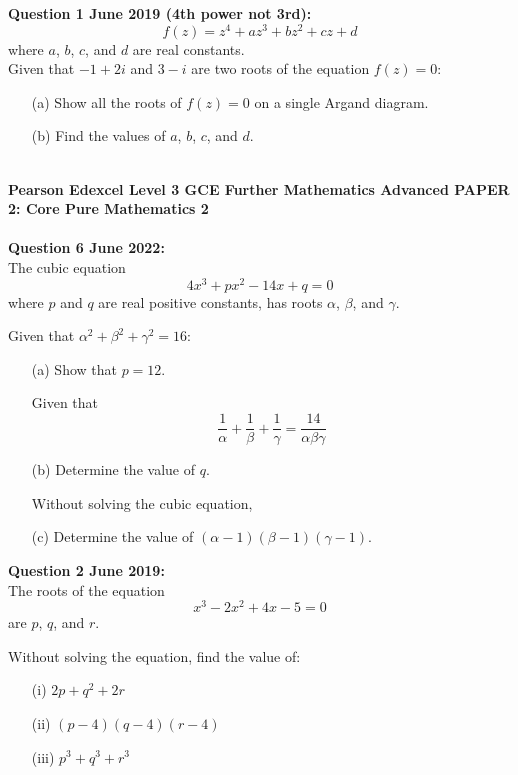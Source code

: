 \documentclass[12pt]{article}
\begin{document}
\textbf{Question 1 June 2019 (4th power not 3rd):}
\[f(z) = z^4 + az^3 + bz^2 + cz + d\] where \( a \), \( b \), \( c \), and \( d \) are real constants.\\
Given that \( -1 + 2i \) and \( 3 - i \) are two roots of the equation \( f(z) = 0 \):

\begin{enumerate}
    \item[(a)] Show all the roots of \( f(z) = 0 \) on a single Argand diagram.
    \item[(b)] Find the values of \( a \), \( b \), \( c \), and \( d \).\\\\
\end{enumerate}

\textbf{Pearson Edexcel Level 3 GCE Further Mathematics
Advanced PAPER 2: Core Pure Mathematics 2}\\\\

\textbf{Question 6 June 2022:}\\
The cubic equation
\[4x^3 + px^2 - 14x + q = 0\]
where \( p \) and \( q \) are real positive constants, has roots \( \alpha \), \( \beta \), and \( \gamma \).

Given that \( \alpha^2 + \beta^2 + \gamma^2 = 16 \):

\begin{enumerate}
    \item[(a)] Show that \( p = 12 \).
    
    Given that 
    \[\frac{1}{\alpha} + \frac{1}{\beta} + \frac{1}{\gamma} = \frac{14}{\alpha \beta \gamma}\]
    \item[(b)] Determine the value of \( q \).
    
    Without solving the cubic equation,
    \item[(c)] Determine the value of \( (\alpha - 1)(\beta - 1)(\gamma - 1) \).
\end{enumerate}

\textbf{Question 2 June 2019:}\\
The roots of the equation 
\[x^3 - 2x^2 + 4x - 5 = 0\]
are \( p \), \( q \), and \( r \).

Without solving the equation, find the value of:
\begin{enumerate}
    \item[(i)] \( 2p + q^2 + 2r \)
    \item[(ii)] \( (p - 4)(q - 4)(r - 4) \)
    \item[(iii)] \( p^3 + q^3 + r^3 \)
\end{enumerate}
\end{document}
